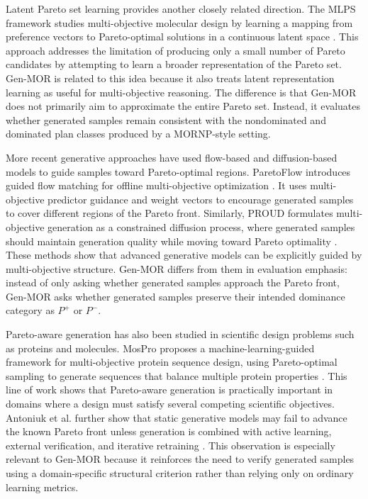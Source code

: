 Latent Pareto set learning provides another closely related direction. The MLPS framework studies multi-objective molecular design by learning a mapping from preference vectors to Pareto-optimal solutions in a continuous latent space \cite{mlps2024latentparetoset}. This approach addresses the limitation of producing only a small number of Pareto candidates by attempting to learn a broader representation of the Pareto set. Gen-MOR is related to this idea because it also treats latent representation learning as useful for multi-objective reasoning. The difference is that Gen-MOR does not primarily aim to approximate the entire Pareto set. Instead, it evaluates whether generated samples remain consistent with the nondominated and dominated plan classes produced by a MORNP-style setting.

More recent generative approaches have used flow-based and diffusion-based models to guide samples toward Pareto-optimal regions. ParetoFlow introduces guided flow matching for offline multi-objective optimization \cite{yuan2025paretoflow}. It uses multi-objective predictor guidance and weight vectors to encourage generated samples to cover different regions of the Pareto front. Similarly, PROUD formulates multi-objective generation as a constrained diffusion process, where generated samples should maintain generation quality while moving toward Pareto optimality \cite{yao2024proud}. These methods show that advanced generative models can be explicitly guided by multi-objective structure. Gen-MOR differs from them in evaluation emphasis: instead of only asking whether generated samples approach the Pareto front, Gen-MOR asks whether generated samples preserve their intended dominance category as $P^{+}$ or $P^{-}$.

Pareto-aware generation has also been studied in scientific design problems such as proteins and molecules. MosPro proposes a machine-learning-guided framework for multi-objective protein sequence design, using Pareto-optimal sampling to generate sequences that balance multiple protein properties \cite{luo2025mospro}. This line of work shows that Pareto-aware generation is practically important in domains where a design must satisfy several competing scientific objectives. Antoniuk et al. further show that static generative models may fail to advance the known Pareto front unless generation is combined with active learning, external verification, and iterative retraining \cite{antoniuk2026active}. This observation is especially relevant to Gen-MOR because it reinforces the need to verify generated samples using a domain-specific structural criterion rather than relying only on ordinary learning metrics.

